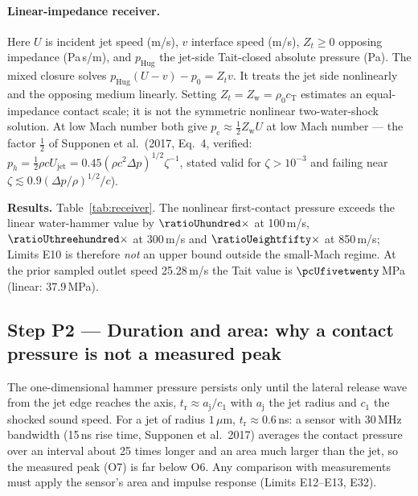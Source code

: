 \paragraph{Linear-impedance receiver.} Here $U$ is incident jet speed (m/s), $v$ interface speed
(m/s), $Z_t\ge0$ opposing impedance (Pa\,s/m), and $p_{\mathrm{Hug}}$ the jet-side
Tait-closed absolute pressure (Pa). The mixed closure solves
$p_{\mathrm{Hug}}(U-v)-p_0=Z_tv$. It treats the jet side nonlinearly and the opposing medium
linearly. Setting $Z_t=Z_{\mathrm w}=\rho_0c_{\mathrm T}$ estimates an equal-impedance contact scale;
it is not the symmetric nonlinear two-water-shock solution. At low Mach number both give
$p_{\mathrm c}\approx\tfrac12Z_{\mathrm w}U$
at low Mach number --- the factor $\tfrac12$ of Supponen et al.\ (2017, Eq.~4, verified:
$p_h=\tfrac12\rho cU_{\mathrm{jet}}=0.45(\rho c^2\Delta p)^{1/2}\zeta^{-1}$, stated valid for $\zeta>10^{-3}$ and
failing near $\zeta\lesssim0.9(\Delta p/\rho)^{1/2}/c$).



\textbf{Results.} Table~\ref{tab:receiver}. The nonlinear first-contact pressure exceeds the linear water-hammer
value by $\ratioUhundred\times$ at 100\,m/s, $\ratioUthreehundred\times$ at 300\,m/s and $\ratioUeightfifty\times$ at
850\,m/s; Limits E10 is therefore \emph{not} an upper bound outside the small-Mach regime. At the prior sampled
outlet speed 25.28\,m/s the Tait value is $\pcUfivetwenty$\,MPa (linear: 37.9\,MPa).

\subsection{Step P2 --- Duration and area: why a contact pressure is not a measured peak}
The one-dimensional hammer pressure persists only until the lateral release wave from the jet edge reaches
the axis, $t_{\mathrm r}\approx a_{\mathrm j}/c_1$ with $a_{\mathrm j}$ the jet radius and $c_1$ the shocked sound
speed. For a jet of radius $1\,\mu$m, $t_{\mathrm r}\approx0.6$\,ns: a sensor with 30\,MHz bandwidth (15\,ns rise
time, Supponen et al.\ 2017) averages the contact pressure over an interval about 25 times longer and an area
much larger than the jet, so the measured peak (O7) is far below O6. Any comparison with measurements must
apply the sensor's area and impulse response (Limits E12--E13, E32).

